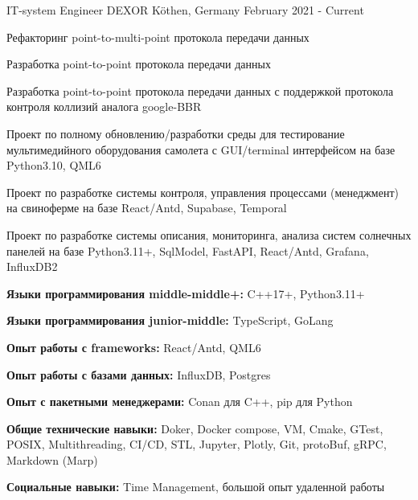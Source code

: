 

\begin{cventries}

  \cventry
    {IT-system Engineer} %
    {DEXOR} %
    {Köthen, Germany} %
    {February 2021 - Current} %
    {
      \begin{cvitems} %
        \item {Рефакторинг point-to-multi-point протокола передачи данных}
        \item {Разработка point-to-point протокола передачи данных}
        \item {Разработка point-to-point протокола передачи данных с поддержкой протокола контроля коллизий аналога google-BBR}
        \item {Проект по полному обновлению/разработки среды для тестирование мультимедийного оборудования самолета с GUI/terminal интерфейсом на базе Python3.10, QML6}
        \item {Проект по разработке системы контроля, управления процессами (менеджмент) на свиноферме на базе React/Antd, Supabase, Temporal}
        \item {Проект по разработке системы описания, мониторинга, анализа систем солнечных панелей на базе Python3.11+, SqlModel, FastAPI, React/Antd, Grafana, InfluxDB2}
        \item {\textbf{Языки программирования middle-middle+:} C++17+, Python3.11+}
        \item {\textbf{Языки программирования junior-middle:} TypeScript, GoLang}
        \item {\textbf{Опыт работы с frameworks:} React/Antd, QML6}
        \item {\textbf{Опыт работы с базами данных:} InfluxDB, Postgres}
        \item {\textbf{Опыт с пакетными менеджерами:} Conan для C++, pip для Python}
        \item {\textbf{Общие технические навыки:} Doker, Docker compose, VM, Cmake, GTest, POSIX, Multithreading, CI/CD, STL, Jupyter, Plotly, Git, protoBuf, gRPC, Markdown (Marp)}
        \item {\textbf{Социальные навыки:} Time Management, большой опыт удаленной работы}
      \end{cvitems}
    }


\end{cventries}
